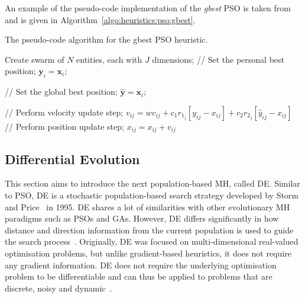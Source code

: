 {An example of the pseudo-code implementation of the \textit{gbest} \acs{PSO} is taken from~\cite{ref:engelbrecht:2007} and is given in Algorithm~\ref{algo:heuristics:pso:gbest}.

\begin{algorithm}[htb]
	\caption{The pseudo-code algorithm for the gbest \acs{PSO} heuristic.}
	\label{algo:heuristics:pso:gbest}
	\begin{algorithmic}
		\State Create swarm of $N$ entities, each with $J$ dimensions;
		\State // Set the personal best position;
		\State $\boldsymbol{y}_{i} = \boldsymbol{x}_{i}$;
		\EndIf

		\State // Set the global best position;
		\State $\boldsymbol{\hat{y}} = \boldsymbol{x}_{i}$;
		\EndIf
		\EndFor

		\State // Perform velocity update step;
		\State $v_{ij} = wv_{ij} + c_{1}r_{1_{j}}[y_{ij} - x_{ij}] + c_{2}r_{2_{j}}[\hat{y}_{ij} - x_{ij}]$
		\State // Perform position update step;
		\State $x_{ij} = x_{ij} + v_{ij}$
		\EndFor
		\EndFor
		\EndWhile
	\end{algorithmic}
\end{algorithm}

\subsection{Differential Evolution}\label{sec:heuristics:mh:de}

This section aims to introduce the next population-based \acs{MH}, called \acf{DE}. Similar to \acs{PSO}, \acs{DE} is a stochastic population-based search strategy developed by Storm and Price~\cite{ref:price:2006} in 1995. \Ac{DE} shares a lot of similarities with other evolutionary \acs{MH} paradigms such as \acp{PSO} and \acp{GA}. However, \acs{DE} differs significantly in how distance and direction information from the current population is used to guide the search process~\cite{ref:engelbrecht:2007}. Originally, \acs{DE} was focused on multi-dimensional real-valued optimisation problems, but unlike gradient-based heuristics, it does not require any gradient information. \acs{DE} does not require the underlying optimisation problem to be differentiable and can thus be applied to problems that are discrete, noisy and dynamic~\cite{ref:rocca:2011}.

}
